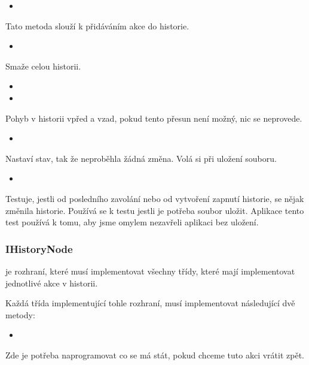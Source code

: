 \documentclass[
  field=inf,
  biblatex,
  glossaries,
  index
]{kidiplom}
\begin{document}
\begin{itemize}
\item {}
\end{itemize}
Tato metoda slouží k přidáváním akce do historie.

\begin{itemize}
\item {}
\end{itemize}
Smaže celou historii.

\begin{itemize}
\item {}
\item {}
\end{itemize}
Pohyb v historii vpřed a vzad, pokud tento přesun není možný, nic se neprovede.

\begin{itemize}
\item {}
\end{itemize}
Nastaví stav, tak že neproběhla žádná změna. Volá si při uložení souboru.

\begin{itemize}
\item {}
\end{itemize}
Testuje, jestli od posledního zavolání  nebo od vytvoření zapnutí historie, se nějak změnila historie. Používá se k testu jestli je potřeba soubor uložit. Aplikace tento test používá k tomu, aby jsme omylem nezavřeli aplikaci bez uložení.

\subsubsection{IHistoryNode}
 je rozhraní, které musí implementovat všechny třídy, které mají implementovat jednotlivé akce v historii.

Každá třída implementující tohle rozhraní, musí implementovat následující dvě metody:

\begin{itemize}
\item {}
\end{itemize}
Zde je potřeba naprogramovat co se má stát, pokud chceme tuto akci vrátit zpět.
\end{document}
